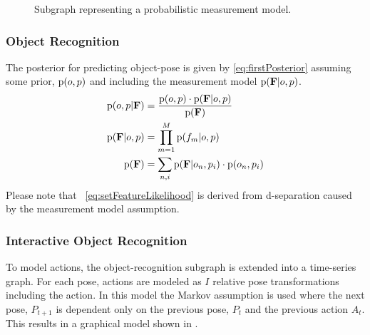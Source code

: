             \begin{figure}[h]
              \centering
              \caption{Subgraph representing a probabilistic measurement model.}
              \label{fig:objectRecognitionSubgraph}
            \end{figure}


 
\subsubsection{Object Recognition}            
            The posterior for predicting object-pose is given by \eqref{eq:firstPosterior} assuming some prior, $\text{p}(o,p)$ and including the measurement model $\text{p}(\mathbf{F}|o,p)$.
            \begin{align}
                \label{eq:firstPosterior}
                \prob{o,p|\set{F}} &= \frac{\prob{o,p} \cdot \prob{\set{F}|o,p}}{\prob{\set{F}}}\\
                \label{eq:setFeatureLikelihood}
                \prob{\set{F}|o,p} &= \prod_{m=1}^{M} \prob{f_m|o,p}\\
                \label{eq:setFeatureEvidence}
                \prob{\set{F}} &= \sum_{n,i} \prob{\set{F}|o_n,p_i}\cdot \prob{o_n,p_i}
            \end{align}
Please note that ~\eqref{eq:setFeatureLikelihood} is derived from d-separation caused by the measurement model assumption.

        \subsubsection{Interactive Object Recognition}
            To model actions, the object-recognition subgraph is extended into a time-series graph. For each pose, actions are modeled as $I$ relative pose transformations including the  action. In this model the Markov assumption is used where the next pose, $P_{t+1}$ is dependent only on the previous pose, $P_t$ and the previous action $A_t$. This results in a graphical model shown in .
            
